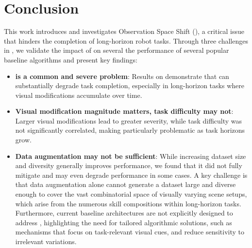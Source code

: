 \section{Conclusion}

This work introduces and investigates Observation Space Shift (\pb), a critical issue that hinders the completion of long-horizon robot tasks. Through three challenges in \bm, we validate the impact of \pb on several the performance of several popular baseline algorithms and present key findings:

\begin{itemize}
    \item \textbf{\pb is a common and severe problem}: Results on \bm demonstrate that \pb can substantially degrade task completion, especially in long-horizon tasks where visual modifications accumulate over time.
    \item \textbf{Visual modification magnitude matters, task difficulty may not}: Larger visual modifications lead to greater \pb severity, while task difficulty was not significantly correlated, making \pb particularly problematic as task horizons grow.
    \item \textbf{Data augmentation may not be sufficient}: While increasing dataset size and diversity generally improves performance, we found that it did not fully mitigate \pb and may even degrade performance in some cases. A key challenge is that data augmentation alone cannot generate a dataset large and diverse enough to cover the vast combinatorial space of visually varying scene setups, which arise from the numerous skill compositions within long-horizon tasks. Furthermore, current baseline architectures are not explicitly designed to address \pb, highlighting the need for tailored algorithmic solutions, such as mechanisms that focus on task-relevant visual cues, and reduce sensitivity to irrelevant variations.
\end{itemize}

